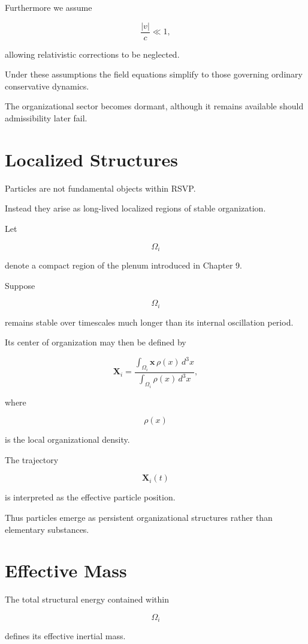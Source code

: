 \documentclass[11pt,oneside]{book}
\numberwithin{equation}{chapter}
\theoremstyle{definition}
\theoremstyle{plain}
\begin{document}
Furthermore we assume

\[
\frac{|v|}{c}\ll1,
\]

allowing relativistic corrections to be neglected.

Under these assumptions the field equations simplify to those governing
ordinary conservative dynamics.

The organizational sector becomes dormant, although it remains available
should admissibility later fail.

\section{Localized Structures}

Particles are not fundamental objects within RSVP.

Instead they arise as long-lived localized regions of stable organization.

Let

\[
\Omega_i
\]

denote a compact region of the plenum introduced in Chapter 9.

Suppose

\[
\Omega_i
\]

remains stable over timescales much longer than its internal oscillation
period.

Its center of organization may then be defined by

\[
\mathbf X_i
=
\frac{\displaystyle
\int_{\Omega_i}
\mathbf x\,\rho(x)\,d^3x}
{\displaystyle
\int_{\Omega_i}
\rho(x)\,d^3x},
\]

where

\[
\rho(x)
\]

is the local organizational density.

The trajectory

\[
\mathbf X_i(t)
\]

is interpreted as the effective particle position.

Thus particles emerge as persistent organizational structures rather than
elementary substances.

\section{Effective Mass}

The total structural energy contained within

\[
\Omega_i
\]

defines its effective inertial mass.
\end{document}
